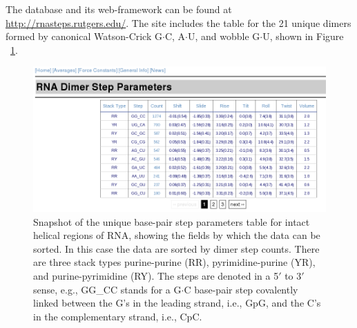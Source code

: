 The    database   and    its   web-framework    can   be    found   at
\url{http://rnasteps.rutgers.edu/}.  The site  includes the  table for
the  21  unique dimers  formed  by  canonical Watson-Crick  G$\cdot$C,
A$\cdot$U, and wobble G$\cdot$U, shown in Figure ~\ref{fig:average}.

\begin{figure}[htbp]
\centering
\includegraphics[angle=0, scale=0.5]{Chapter4/average.png}
\caption{Snapshot of  the unique  base-pair step parameters  table for
intact helical  regions of RNA, showing  the fields by  which the data
can  be  sorted. In  this  case  the data  are  sorted  by dimer  step
counts.   There   are    three   stack   types   purine-purine   (RR),
pyrimidine-purine  (YR),  and purine-pyrimidine  (RY).  The steps  are
denoted in a  5$'$ to 3$'$ sense, e.g., GG\_CC  stands for a G$\cdot$C
base-pair  step  covalently linked  between  the  G's  in the  leading
strand,  i.e., GpG,  and the  C's in  the complementary  strand, i.e.,
CpC.}
\label{fig:average}
\end{figure}  

